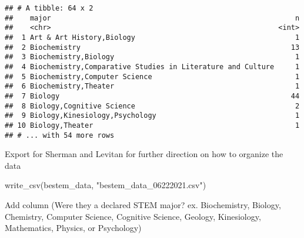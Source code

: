 \documentclass[
]{article}
\newenvironment{Shaded}{\begin{snugshade}}{\end{snugshade}}
\newcommand{\FunctionTok}[1]{\textcolor[rgb]{0.00,0.00,0.00}{#1}}
\newcommand{\NormalTok}[1]{#1}
\newcommand{\StringTok}[1]{\textcolor[rgb]{0.31,0.60,0.02}{#1}}
\begin{document}
\begin{verbatim}
## # A tibble: 64 x 2
##    major                                                          n
##    <chr>                                                      <int>
##  1 Art & Art History,Biology                                      1
##  2 Biochemistry                                                  13
##  3 Biochemistry,Biology                                           1
##  4 Biochemistry,Comparative Studies in Literature and Culture     1
##  5 Biochemistry,Computer Science                                  1
##  6 Biochemistry,Theater                                           1
##  7 Biology                                                       44
##  8 Biology,Cognitive Science                                      2
##  9 Biology,Kinesiology,Psychology                                 1
## 10 Biology,Theater                                                1
## # ... with 54 more rows
\end{verbatim}

Export for Sherman and Levitan for further direction on how to organize
the data

\begin{Shaded}
\begin{Highlighting}[]
\FunctionTok{write\_csv}\NormalTok{(bestem\_data, }\StringTok{"bestem\_data\_06222021.csv"}\NormalTok{)}
\end{Highlighting}
\end{Shaded}

Add column (Were they a declared STEM major? ex. Biochemistry, Biology,
Chemistry, Computer Science, Cognitive Science, Geology, Kinesiology,
Mathematics, Physics, or Psychology)
\end{document}

